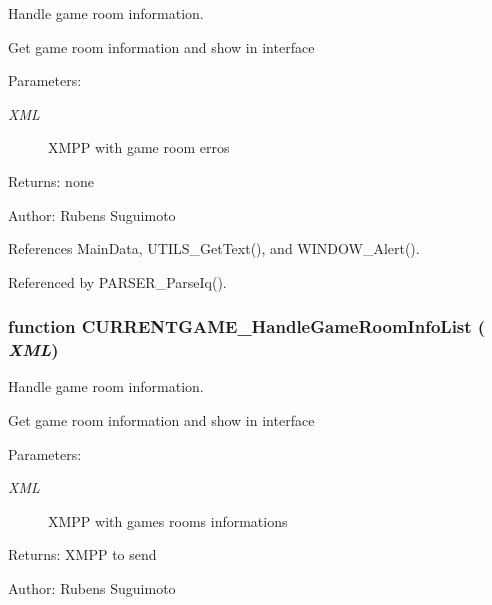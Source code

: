 Handle game room information. 

Get game room information and show in interface

\begin{Desc}
\item[Parameters:]
\begin{description}
\item[{\em XML}]XMPP with game room erros \end{description}
\end{Desc}
\begin{Desc}
\item[Returns:]none \end{Desc}
\begin{Desc}
\item[Author:]Rubens Suguimoto \end{Desc}


References MainData, UTILS\_\-GetText(), and WINDOW\_\-Alert().

Referenced by PARSER\_\-ParseIq().
\subsubsection[CURRENTGAME\_\-HandleGameRoomInfoList]{\setlength{\rightskip}{0pt plus 5cm}function CURRENTGAME\_\-HandleGameRoomInfoList ( {\em XML})}\label{currentgame_8js_ea10d650106d92edc57517c0289ab45f}


Handle game room information. 

Get game room information and show in interface

\begin{Desc}
\item[Parameters:]
\begin{description}
\item[{\em XML}]XMPP with games rooms informations \end{description}
\end{Desc}
\begin{Desc}
\item[Returns:]XMPP to send \end{Desc}
\begin{Desc}
\item[Author:]Rubens Suguimoto \end{Desc}


